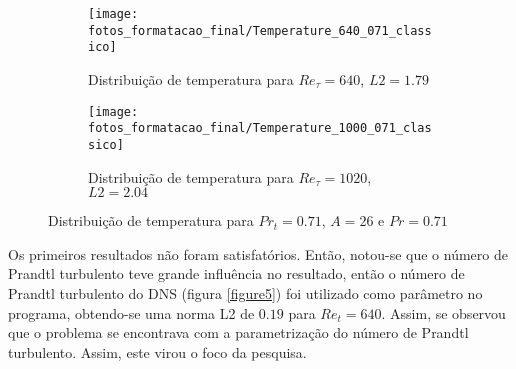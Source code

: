 \begin{figure*}[h!]
	\begin{subfigure}[t]{0.49\textwidth}
		\centering
		\texttt{[image: fotos\_formatacao\_final/Temperature\_640\_071\_classico]}
		\caption{Distribuição de temperatura para $Re_\tau = 640$, $L2 = 1.79$}
	\end{subfigure}%
	\begin{subfigure}[t]{0.49\textwidth}
		\centering
		\texttt{[image: fotos\_formatacao\_final/Temperature\_1000\_071\_classico]}
		\caption{Distribuição de temperatura para $Re_\tau = 1020$, $L2 = 2.04$}
	\end{subfigure}%
	\caption{Distribuição de temperatura para $Pr_t = 0.71$, $A = 26$ e $Pr = 0.71$} 
	\label{figuraresultados1}
\end{figure*}	

Os primeiros resultados não foram satisfatórios. Então, notou-se que o número de Prandtl turbulento teve grande influência no resultado, então o número de Prandtl turbulento do DNS (figura \ref{figure5}) foi utilizado como parâmetro no programa, obtendo-se uma norma L2 de $ 0.19 $ para $ Re_t = 640 $. Assim, se observou que o problema se encontrava com a parametrização do número de Prandtl turbulento. Assim, este virou o foco da pesquisa.

